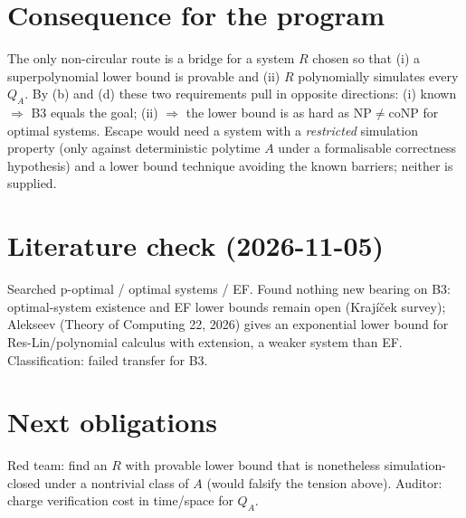 \documentclass[11pt]{article}
\begin{document}
\section*{Consequence for the program}
The only non-circular route is a bridge for a system $R$ chosen so that (i) a superpolynomial lower bound is provable and (ii) $R$ polynomially simulates every $Q_A$. By (b) and (d) these two requirements pull in opposite directions: (i) known $\Rightarrow$ B3 equals the goal; (ii) $\Rightarrow$ the lower bound is as hard as $\mathrm{NP}\ne\mathrm{coNP}$ for optimal systems. Escape would need a system with a \emph{restricted} simulation property (only against deterministic polytime $A$ under a formalisable correctness hypothesis) and a lower bound technique avoiding the known barriers; neither is supplied.

\section*{Literature check (2026-11-05)}
Searched p-optimal / optimal systems / EF. Found nothing new bearing on B3: optimal-system existence and EF lower bounds remain open (Krajíček survey); Alekseev (Theory of Computing 22, 2026) gives an exponential lower bound for Res-Lin/polynomial calculus with extension, a weaker system than EF. Classification: failed transfer for B3.

\section*{Next obligations}
Red team: find an $R$ with provable lower bound that is nonetheless simulation-closed under a nontrivial class of $A$ (would falsify the tension above). Auditor: charge verification cost in time/space for $Q_A$.

\end{document}
